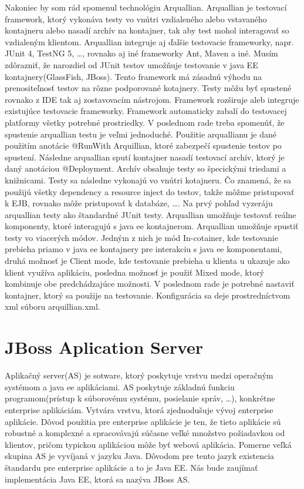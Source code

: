Nakoniec by som rád spomenul technológiu Arquallian. Arquallian je testovací framework, ktorý vykonáva testy vo vnútri vzdialeného alebo vstavaného kontajneru alebo nasadí archív na kontajner, tak aby test mohol interagovať so vzdialeným klientom. Arquallian integruje aj ďalšie testovacie frameworky, napr. JUnit 4, TestNG 5, \ldots, rovnako aj iné frameworky Ant, Maven a iné. Musím zdôrazniť, že narozdiel od JUnit testov umožňuje testovanie v java EE kontajnery(GlassFish, JBoss)\cite{arqbook}. Tento framework má zásadnú výhodu na prenositeľnosť testov na rôzne podporované kotajnery. Testy môžu byť spustené rovnako z IDE tak aj zostavovacím nástrojom. Framework rozširuje aleb integruje existujúce testovacie frameworky. Framework automaticky zabalí do testovacej platformy všetky potrebné prostriedky. V poslednom rade treba spomenúť, že spustenie arquallian testu je veľmi jednoduché. Použitie arquallianu je dané použitím anotácie @RunWith Arquillian, ktoré zabezpečí spustenie testov po spustení. Následne arquallian sputí kontajner nasadí testovací archív, ktorý je daný anotáciou @Deployment. Archív obsahuje testy so špecickými triedami a knižnicami. Testy sa následne vykonajú vo vnútri kotajneru. Čo znamená, že sa použijú všetky dependency a resource inject do testov, takže môžme pristupovať k EJB, rovnako môže pristupovať k databáze, \ldots. Na prvý pohľad vyzeráju arquallian testy ako štandardné JUnit testy. Arquallian umožňuje testovať reálne komponenty, ktoré interagujú s java ee kontajnerom. Arquallian umožňuje spustiť testy vo viacerých módov. Jedným z nich je mód In-cotainer, kde testovanie prebieha priamo v java ee kontajnery pre interakciu s java ee komponentami, druhá možnosť je Client mode, kde testovanie prebieha u klienta u ukazuje ako klient využíva aplikáciu, posledna možnosť je použiť Mixed mode, ktorý kombinuje obe predchádzajúce možnosti. V poslednom rade je potrebné nastaviť kontajner, ktorý sa použije na testovanie. Konfigurácia sa deje prostredníctvom xml súboru arquillian.xml.


\chapter{JBoss Aplication Server}
Aplikačný server(AS) je sotware, ktorý poskytuje vrstvu medzi operačným systémom a java ee aplikáciami. AS poskytuje základnú funkciu programom(prístup k súborovému systému, posielanie správ, \ldots), konkrétne enterprise aplikáciám. Vytvára vrstvu, ktorá zjednodušuje vývoj enterprise aplikácie. Dôvod použitia pre enterprise aplikácie je ten, že tieto aplikácie sú robustné a komplexné a spracovávajú súčasne veľké množstvo požiadavkou od klientov, pričom typickou aplikáciou môže byť webová aplikácia. Pomerne veľká skupina AS je vyvíjaná v jazyku Java. Dôvodom pre tento jazyk existencia štandardu pre enterprise aplikácie a to je Java EE. Nás bude zaujímať implementácia Java EE, ktorá sa nazýva JBoss AS.

